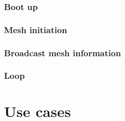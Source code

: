 		\subsubsection{Boot up}
		
		\subsubsection{Mesh initiation}
		
		\subsubsection{Broadcast mesh information}
		
		\subsubsection{Loop}
		
\section{Use cases}

